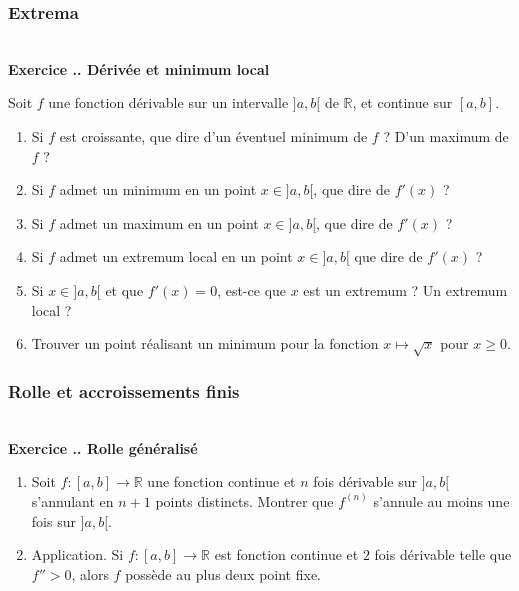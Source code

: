 \documentclass{article}
\newcommand{\mb}[1]{\mathbb{#1}}
\newcounter{exo}
\newcommand{\exercice}[1][\null]{\textbf{\\ Exercice \thesection.\theexo. #1} \addtocounter{exo}{1}}
\begin{document}
\subsubsection{Extrema}




\exercice[Dérivée et minimum local]

Soit $f$ une fonction dérivable sur un intervalle $]a,b[$ de $\mb{R}$,
et continue sur $[a,b]$.

\begin{enumerate}
    \item Si $f$ est croissante, que dire d'un éventuel minimum de $f$ ? 
        D'un maximum de $f$ ?
    \item Si $f$ admet un minimum en un point $x \in ]a,b[$, 
        que dire de $f'(x)$ ?
    \item Si $f$ admet un maximum en un point $x \in ]a,b[$,
        que dire de $f'(x)$ ?
    \item Si $f$ admet un extremum local en un point $x \in ]a,b[$
        que dire de $f'(x)$ ?
    \item Si $x \in ]a,b[$ et que $f'(x) = 0$, est-ce que $x$
        est un extremum ? Un extremum local ?
    \item Trouver un point réalisant un
        minimum pour la fonction $x \mapsto \sqrt{x}$ pour $x \geq 0$.
\end{enumerate}





\subsubsection{Rolle et accroissements finis}

\exercice[Rolle généralisé]

\begin{enumerate}

\item Soit $f : [a,b] \rightarrow \mb{R}$ une fonction continue et $n$ fois dérivable sur $]a,b[$s'annulant en $n+1$ points distincts. Montrer que $f^{(n)}$ s'annule au moins une fois sur $]a,b[$.

\item Application. Si $f : [a,b] \rightarrow \mb{R}$ est fonction continue et $2$ fois dérivable telle que $f'' > 0$, alors $f$ possède au plus deux point fixe.


\end{enumerate}
\end{document}
